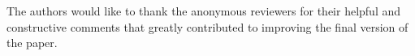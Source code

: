 \documentclass[english,reprint, aps, prl,superscriptaddress, showpacs,
showkeys, longbibliography, amsmath, amssymb, floatfix]{revtex4-1}
\theoremstyle{plain}
\theoremstyle{definition}
\begin{document}
{\color{red}\begin{acknowledgments}
The authors would like to thank the anonymous reviewers for their helpful and
constructive comments that greatly contributed to improving the final version of the paper.
\end{acknowledgments}}

% 

\end{document}
